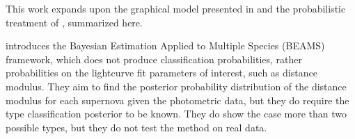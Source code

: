 \documentclass[12pt, onecolumn]{emulateapj}
\newcommand{\textul}{\underline}
\begin{document}
This work expands upon the graphical model presented in \citet{Ma16} and the probabilistic treatment of \citet{Kunz07}, summarized here.

\citet{Kunz07} introduces the Bayesian Estimation Applied to Multiple Species (BEAMS) framework, which does not produce classification probabilities, rather probabilities on the lightcurve fit parameters of interest, such as distance modulus.  They aim to find the posterior probability distribution of the distance modulus for each supernova given the photometric data, but they do require the type classification posterior to be known.  They do show the case more than two possible types, but they do not test the method on real data.



%
%
\end{document}
